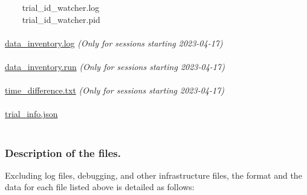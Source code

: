 \verb|    |trial\_id\_watcher.log\\
\verb|    |trial\_id\_watcher.pid\\\\
\hyperref[data_inventory.log]{data\_inventory.log} \textit{(Only for sessions starting 2023-04-17)}\\\\
\hyperref[data_inventory.run]{data\_inventory.run} \textit{(Only for sessions starting 2023-04-17)}\\\\
\hyperref[time_difference.txt]{time\_difference.txt} \textit{(Only for sessions starting 2023-04-17)}\\\\
\hyperref[trial_info.json]{trial\_info.json}\\\\

\subsubsection{Description of the files.}

\noindent
Excluding log files, debugging, and other infrastructure files, the format and
the data for each file listed above is detailed as follows: \\


